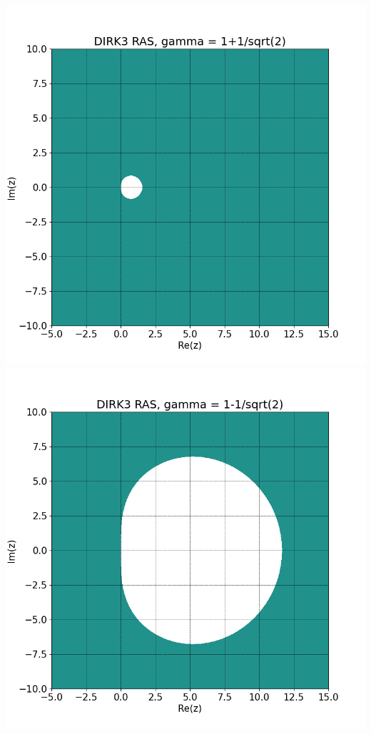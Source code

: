 \documentclass{article}
\begin{document}
\begin{enumerate}
\begin{enumerate}
	\begin{center}
		\includegraphics[scale=.3]{hw3 dirk3 ras 1}
		\includegraphics[scale=.3]{hw3 dirk3 ras 2}
	\end{center}
	

\end{enumerate}
\end{enumerate}
\end{document}
